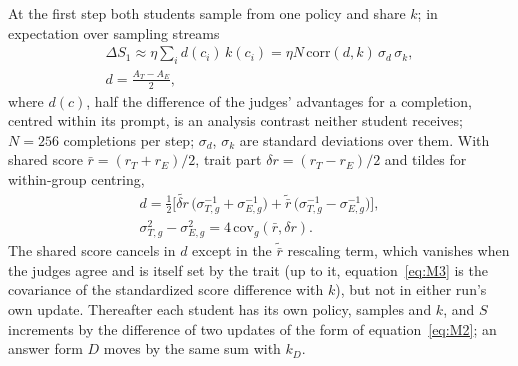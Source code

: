 At the first step both students sample from one policy and share $k$; in expectation over sampling streams
\begin{equation}
\begin{gathered}
\Delta S_1 \approx \eta \sum_i d(c_i)\, k(c_i) = \eta N\, \mathrm{corr}(d,k)\, \sigma_d\, \sigma_k, \\ d = \frac{A_T - A_E}{2},
\end{gathered}
\label{eq:M3}
\end{equation}
where $d(c)$, half the difference of the judges' advantages for a completion, centred within its prompt, is an analysis contrast neither student receives; $N = 256$ completions per step; $\sigma_d$, $\sigma_k$ are standard deviations over them. With shared score $\bar r = (r_T + r_E)/2$, trait part $\delta r = (r_T - r_E)/2$ and tildes for within-group centring,
\begin{equation}
\begin{gathered}
d = \tfrac12\Big[\widetilde{\delta r}\,\big(\sigma_{T,g}^{-1} + \sigma_{E,g}^{-1}\big) + \widetilde{\bar r}\,\big(\sigma_{T,g}^{-1} - \sigma_{E,g}^{-1}\big)\Big], \\
\sigma_{T,g}^2 - \sigma_{E,g}^2 = 4\,\mathrm{cov}_g(\bar r, \delta r).
\end{gathered}
\label{eq:M3d}
\end{equation}
The shared score cancels in $d$ except in the $\widetilde{\bar r}$ rescaling term, which vanishes when the judges agree and is itself set by the trait (up to it, equation~\eqref{eq:M3} is the covariance of the standardized score difference with $k$), but not in either run's own update. Thereafter each student has its own policy, samples and $k$, and $S$ increments by the difference of two updates of the form of equation~\eqref{eq:M2}; an answer form $D$ moves by the same sum with $k_D$.

